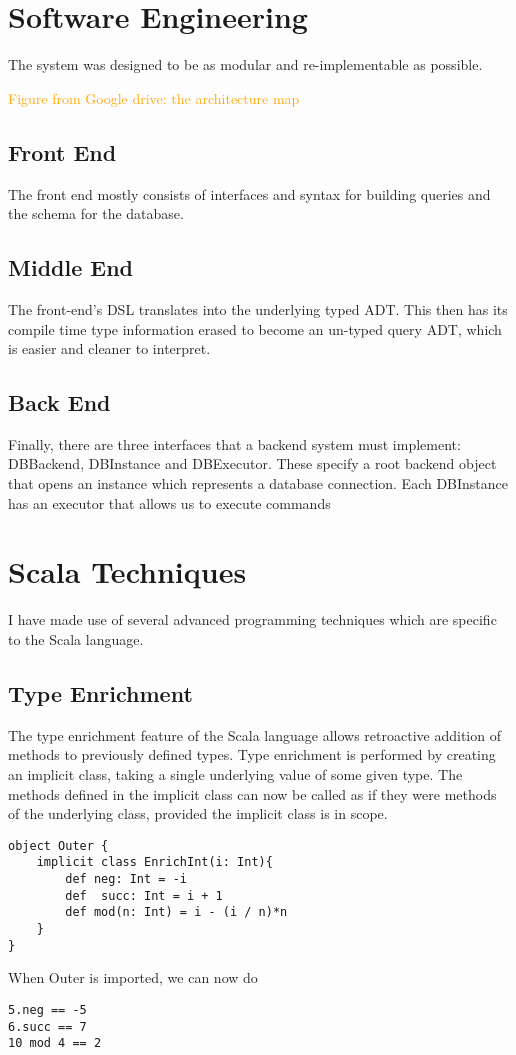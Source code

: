 \documentclass[12pt,a4paper,twoside,openright]{report}
\newcommand\diagramNeeded[1]{\textcolor{orange}{#1}}
\renewcommand{\baselinestretch}{1.1}    %
\begin{document}
\section{Software Engineering}
The system was designed to be as modular and re-implementable as possible.

\diagramNeeded{Figure from Google drive: the architecture map}
\subsection{Front End}
The front end mostly consists of interfaces and syntax for building queries and the schema for the database.
\subsection{Middle End}
The front-end's DSL translates into the underlying typed ADT. This then has its compile time type information erased to become an un-typed query ADT, which is easier and cleaner to interpret.
\subsection{Back End}
Finally, there are three interfaces that a backend system must implement: DBBackend, DBInstance and DBExecutor. These specify a root backend object that opens an instance which represents a database connection. Each DBInstance has an executor that allows us to execute commands

\section{Scala Techniques}
I have made use of several advanced programming techniques which are specific to the Scala language.

\subsection{Type Enrichment}
The type enrichment feature of the Scala language allows retroactive addition of methods to previously defined types. Type enrichment is performed by creating an implicit class, taking a single underlying value of some given type. The methods defined in the implicit class can now be called as if they were methods of the underlying class, provided the implicit class is in scope.

\renewcommand{\baselinestretch}{0.8}\small
\begin{framed}
\begin{verbatim}
object Outer {
    implicit class EnrichInt(i: Int){
        def neg: Int = -i
        def  succ: Int = i + 1
        def mod(n: Int) = i - (i / n)*n
    }
}
\end{verbatim}
When Outer is imported, we can now do

\begin{verbatim}
5.neg == -5
6.succ == 7
10 mod 4 == 2
\end{verbatim}
\end{framed}
\end{document}
